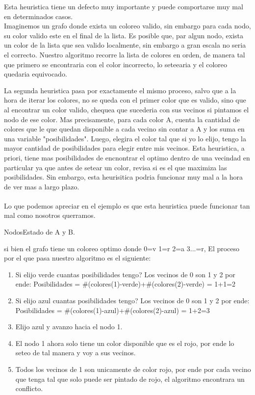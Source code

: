  
 Esta heuristica tiene un defecto muy importante y puede comportarse muy mal en determinados casos.\\
 Imaginemos un grafo donde exista un coloreo valido, sin embargo para cada nodo, su color valido este en el final de la lista. Es posible que, par algun nodo, exista un color de la lista que sea valido localmente, sin embargo a gran escala no seria el correcto. Nuestro algoritmo recorre la lista de colores en orden, de manera tal que primero se encontraria con el color incorrecto, lo seteearia y el coloreo quedaria equivocado.
 
 La segunda heuristica pasa por exactamente el mismo proceso, salvo que a la hora de iterar los colores, no se queda con el primer color que es valido, sino que al encontrar un color valido, chequea que sucederia con sus vecinos si pintamos el nodo de ese color. Mas precisamente, para cada color A, cuenta la cantidad de colores que le que quedan disponible a cada vecino sin contar a A y los suma en una variable "posibilidades". Luego, elegira el color tal que si yo lo elijo, tengo la mayor cantidad de posibilidades para elegir entre mis vecinos. Esta heuristica, a priori, tiene mas posibilidades de encnontrar el optimo dentro de una vecindad en particular ya que antes de setear un color, revisa si es el que maximiza las posibilidades. Sin embargo, esta heurisitica podria funcionar muy mal a la hora de ver mas a largo plazo.\\\\
 Lo que podemos apreciar en el ejemplo es que esta heuristica puede funcionar tan mal como nosotros querramos.
\begin{center}

\caption{NodosEstado de A y B.}
\end{center}

 si bien el grafo tiene un coloreo optimo donde 0=v 1=r 2=a 3...=r, El proceso por el que pasa nuestro algoritmo es el siguiente:
 \begin{enumerate}
 \item Si elijo verde cuantas posibilidades tengo? Los vecinos de 0 son 1 y 2 por ende: Posibilidades = #(colores(1)-verde)+#(colores(2)-verde) = 1+1=2
 \item Si elijo azul cuantas posibilidades tengo? Los vecinos de 0 son 1 y 2 por ende: Posibilidades = #(colores(1)-azul)+#(colores(2)-azul) = 1+2=3
 \item Elijo azul y avanzo hacia el nodo 1.
 \item El nodo 1 ahora solo tiene un color disponible que es el rojo, por ende lo seteo de tal manera y voy a sus vecinos.
 \item Todos los vecinos de 1 son unicamente de color rojo, por ende por cada vecino que tenga tal que solo puede ser pintado de rojo, el algoritmo encontrara un conflicto.
 \end{enumerate}\\

